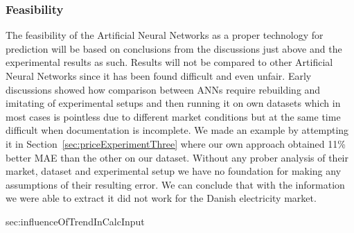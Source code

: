 \subsubsection{Feasibility}
The feasibility of the Artificial Neural Networks as a proper technology for prediction will be based on conclusions from the discussions just above and the experimental results as such. Results will not be compared to other Artificial Neural Networks since it has been found difficult and even unfair. Early discussions showed how comparison between ANNs require rebuilding and imitating of experimental setups and then running it on own datasets which in most cases is pointless due to different market conditions but at the same time difficult when documentation is incomplete. We made an example by attempting it in Section~\ref{sec:priceExperimentThree} where our own approach obtained 11\% better MAE than the other on our dataset. Without any prober analysis of their market, dataset and experimental setup we have no foundation for making any assumptions of their resulting error. We can conclude that with the information we were able to extract it did not work for the Danish electricity market. 

sec:influenceOfTrendInCalcInput


